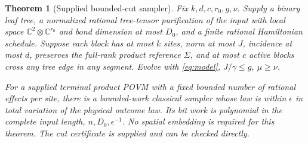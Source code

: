 \documentclass[11pt,reqno]{amsart}
\numberwithin{equation}{section}
\newtheorem{theorem}{Theorem}[section]
\theoremstyle{definition}
\theoremstyle{remark}
\newcommand{\C}{\mathbb C}
\begin{document}
\begin{theorem}[Supplied bounded-cut sampler]\label{thm:cuts}
Fix $k,d,c,r_0,g,\nu$. Supply a binary leaf tree, a normalized rational tree-tensor purification of the input with local space $\C^2\otimes\C^{r_0}$ and bond dimension at most $D_0$, and a finite rational Hamiltonian schedule. Suppose each block has at most $k$ sites, norm at most $J$, incidence at most $d$, preserves the full-rank product reference $\Sigma$, and at most $c$ active blocks cross any tree edge in any segment. Evolve with \eqref{eq:model}, $J/\gamma\leq g$, $\mu\geq\nu$.

For a supplied terminal product POVM with a fixed bounded number of rational effects per site, there is a bounded-work classical sampler whose law is within $\epsilon$ in total variation of the physical outcome law. Its bit work is polynomial in the complete input length, $n,D_0,\epsilon^{-1}$. No spatial embedding is required for this theorem. The cut certificate is supplied and can be checked directly.
\end{theorem}
\end{document}
